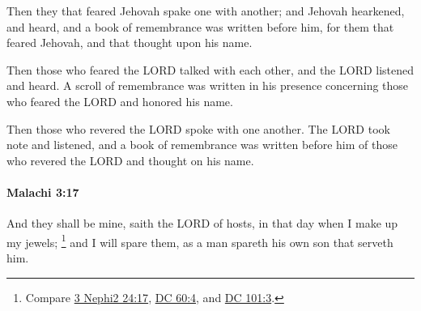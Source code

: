 			\begin{versebox}
					\item[BHS] 
					\item[LXX] 
					\item[ASV] Then they that feared Jehovah spake one with another; and Jehovah hearkened, and heard, and a book of remembrance was written before him, for them that feared Jehovah, and that thought upon his name.
					\item[NIV] Then those who feared the LORD talked with each other, and the LORD listened and heard. A scroll of remembrance was written in his presence concerning those who feared the LORD and honored his name.
					\item[NRSV] Then those who revered the LORD spoke with one another. The LORD took note and listened, and a book of remembrance was written before him of those who revered the LORD and thought on his name.
			\end{versebox}

		\paragraph{Malachi 3:17} %
			\label{MALACHI-3-17}

			And they shall be mine, saith the LORD of hosts, in that day when I make up my jewels;%
				\footnote{%
					Compare \hyperref[3NEPHI-24-17]{3 Nephi2 24:17}, \hyperref[DC60-4]{DC 60:4}, and \hyperref[DC101-3]{DC 101:3}.
					}
			and I will spare them, as a man spareth his own son that serveth him.

